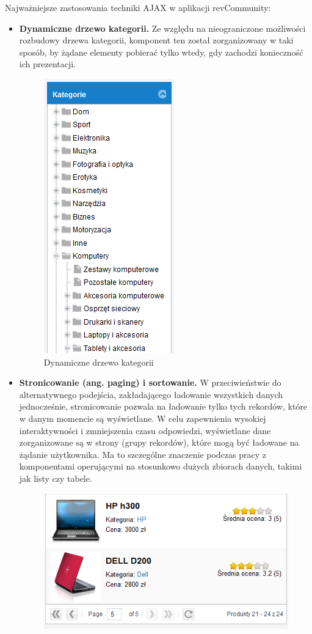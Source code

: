 Najważniejsze zastosowania techniki AJAX w aplikacji revCommunity:
\begin{itemize}
\item\textbf{Dynamiczne drzewo kategorii.} Ze względu na nieograniczone możliwości rozbudowy drzewa kategorii, komponent ten został zorganizowany w taki sposób, by żądane elementy pobierać tylko wtedy, gdy zachodzi konieczność ich prezentacji.
\begin{figure}[H]
	\centering
	\includegraphics[scale=0.7]{images/Kategorie.png}
	\caption{Dynamiczne drzewo kategorii}
\end{figure}
\item\textbf{Stronicowanie (ang. paging) i sortowanie.} W przeciwieństwie do alternatywnego podejścia, zakładającego ładowanie wszystkich danych jednocześnie, stronicowanie pozwala na ładowanie tylko tych rekordów, które w danym momencie są wyświetlane. W celu zapewnienia wysokiej interaktywności i zmniejszenia czasu odpowiedzi, wyświetlane dane zorganizowane są w strony (grupy rekordów), które mogą być ładowane na żądanie użytkownika. Ma to szczególne znaczenie podczas pracy z komponentami operującymi na stosunkowo dużych zbiorach danych, takimi jak listy czy tabele.
\begin{figure}[H]
	\centering
	\includegraphics[scale=0.7]{images/paging.png}

\end{figure}
\end{itemize}
